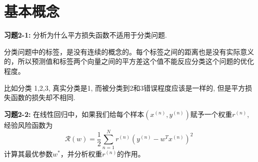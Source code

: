 \section{基本概念}

\noindent\textbf{习题2-1:} 分析为什么平方损失函数不适用于分类问题.

分类问题中的标签，是没有连续的概念的。每个标签之间的距离也是没有实际意义的，所以预测值和标签两个向量之间的平方差这个值不能反应分类这个问题的优化程度。

比如分类 1,2,3, 真实分类是1, 而被分类到2和3错误程度应该是一样的, 但是平方损失函数的损失却不相同.

\noindent\textbf{习题2-2:} 在线性回归中，如果我们给每个样本$(x^{(n)},y^{(n)})$赋予一个权重$r^{(n)}$,
经验风险函数为
\begin{equation}
\mathcal{R}(w) = \frac{1}{2}\sum_{n=1}^N r^{(n)}(y^{(n)} - w^T x^{(n)})^2
\end{equation}
计算其最优参数$w^{*}$，并分析权重$r^{(n)}$的作用。

